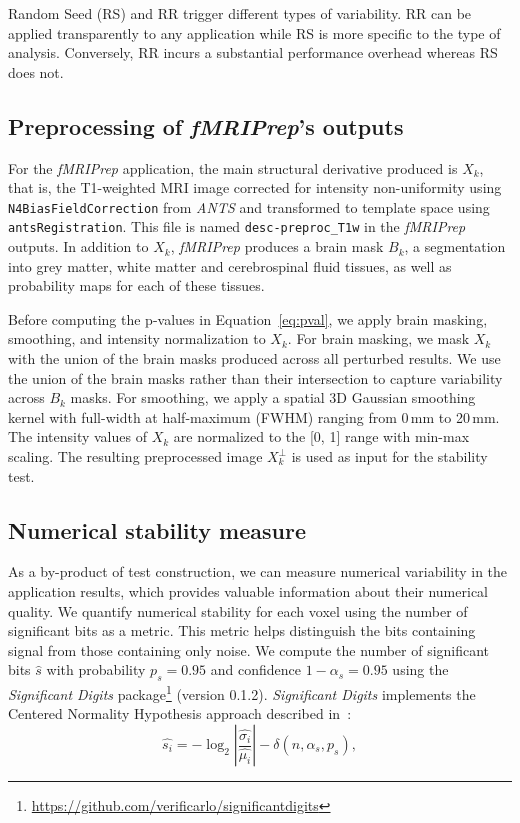 \documentclass[lettersize,journal]{IEEEtran}
\newcommand{\fmriprep}{\emph{fMRIPrep}\xspace}
\newcommand{\fwhm}{\textsc{FWHM}}
\begin{document}
{Random Seed (RS) and RR trigger different types of variability. RR can be applied transparently to any application while RS is more specific to the type of analysis. Conversely, RR incurs a substantial performance overhead whereas RS does not.

\subsection{Preprocessing of \fmriprep's outputs}
\label{subsec:preprocessing}

For the \fmriprep application, the main structural derivative produced is $X_k$, that is, the T1-weighted MRI image corrected for intensity non-uniformity using \texttt{N4BiasFieldCorrection} from \emph{ANTS} and transformed to template space using \texttt{antsRegistration}.
This file is named \texttt{desc-preproc\_T1w} in the \fmriprep outputs. In addition to $X_k$, \fmriprep produces a brain mask $B_k$, a segmentation into grey matter, white matter and cerebrospinal fluid tissues, as well as probability maps for each of these tissues.

Before computing the p-values in Equation~\ref{eq:pval}, we apply brain masking, smoothing, and intensity normalization to $X_k$. For brain masking, we mask $X_k$ with the union of the brain masks produced across all perturbed results. We use the union of the brain masks rather than their intersection to capture variability across $B_k$ masks.
For smoothing, we apply a spatial 3D Gaussian smoothing kernel with full-width at half-maximum (\fwhm) ranging from 0\,mm to 20\,mm.
The intensity values of $X_k$ are normalized to the [0, 1] range with min-max scaling.
The resulting preprocessed image $X_k^\perp$ is used as input for the stability test.

\subsection{Numerical stability measure}
\label{subsec:sigbits}

As a by-product of test construction, we can measure numerical variability in the application results, which provides valuable information about their numerical quality.
We quantify numerical stability for each voxel using the number of significant bits as a metric. This metric helps distinguish the bits containing signal from those containing only noise. We compute the number of significant bits $\hat{s}$ with probability $p_s=0.95$ and confidence $1-\alpha_s=0.95$ using the \emph{Significant Digits} package\footnote{\url{https://github.com/verificarlo/significantdigits}} (version 0.1.2).
\emph{Significant Digits} implements the Centered Normality Hypothesis approach described in~\cite{sohier2021confidence}:
\[
  \hat{s_i} = -\log_2 \left| \frac{\hat{\sigma_i}}{\hat{\mu_i}} \right| - \delta(n, \alpha_s, p_s),
\]

}
\end{document}
